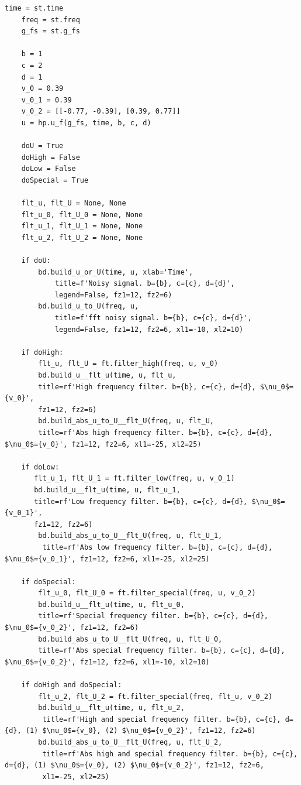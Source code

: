 \documentclass[a4paper, 12pt]{article}
\begin{document}
    \begin{lstlisting}[label=l7, caption={Файл nospec.py. Фильтрация специфических частот.}]
    time = st.time
    freq = st.freq
    g_fs = st.g_fs
        
    b = 1
    c = 2
    d = 1
    v_0 = 0.39
    v_0_1 = 0.39
    v_0_2 = [[-0.77, -0.39], [0.39, 0.77]]
    u = hp.u_f(g_fs, time, b, c, d)
        
    doU = True
    doHigh = False
    doLow = False
    doSpecial = True
        
    flt_u, flt_U = None, None
    flt_u_0, flt_U_0 = None, None
    flt_u_1, flt_U_1 = None, None
    flt_u_2, flt_U_2 = None, None
        
    if doU:
        bd.build_u_or_U(time, u, xlab='Time',
            title=f'Noisy signal. b={b}, c={c}, d={d}',
            legend=False, fz1=12, fz2=6)
        bd.build_u_to_U(freq, u,
            title=f'fft noisy signal. b={b}, c={c}, d={d}',
            legend=False, fz1=12, fz2=6, xl1=-10, xl2=10)
        
    if doHigh:
        flt_u, flt_U = ft.filter_high(freq, u, v_0)
        bd.build_u__flt_u(time, u, flt_u,
        title=rf'High frequency filter. b={b}, c={c}, d={d}, $\nu_0$={v_0}',
        fz1=12, fz2=6)
        bd.build_abs_u_to_U__flt_U(freq, u, flt_U,
        title=rf'Abs high frequency filter. b={b}, c={c}, d={d}, $\nu_0$={v_0}', fz1=12, fz2=6, xl1=-25, xl2=25)
        
    if doLow:
       flt_u_1, flt_U_1 = ft.filter_low(freq, u, v_0_1)
       bd.build_u__flt_u(time, u, flt_u_1,
       title=rf'Low frequency filter. b={b}, c={c}, d={d}, $\nu_0$={v_0_1}',
       fz1=12, fz2=6)
        bd.build_abs_u_to_U__flt_U(freq, u, flt_U_1,
         title=rf'Abs low frequency filter. b={b}, c={c}, d={d}, $\nu_0$={v_0_1}', fz1=12, fz2=6, xl1=-25, xl2=25)
        
    if doSpecial:
        flt_u_0, flt_U_0 = ft.filter_special(freq, u, v_0_2)
        bd.build_u__flt_u(time, u, flt_u_0,
        title=rf'Special frequency filter. b={b}, c={c}, d={d}, $\nu_0$={v_0_2}', fz1=12, fz2=6)
        bd.build_abs_u_to_U__flt_U(freq, u, flt_U_0,
        title=rf'Abs special frequency filter. b={b}, c={c}, d={d}, $\nu_0$={v_0_2}', fz1=12, fz2=6, xl1=-10, xl2=10)
        
    if doHigh and doSpecial:
        flt_u_2, flt_U_2 = ft.filter_special(freq, flt_u, v_0_2)
        bd.build_u__flt_u(time, u, flt_u_2,
         title=rf'High and special frequency filter. b={b}, c={c}, d={d}, (1) $\nu_0$={v_0}, (2) $\nu_0$={v_0_2}', fz1=12, fz2=6)
        bd.build_abs_u_to_U__flt_U(freq, u, flt_U_2,
         title=rf'Abs high and special frequency filter. b={b}, c={c}, d={d}, (1) $\nu_0$={v_0}, (2) $\nu_0$={v_0_2}', fz1=12, fz2=6,
         xl1=-25, xl2=25)
        

\end{lstlisting}
\end{document}
